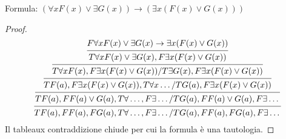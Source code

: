 Formula: $(\forall x F(x) \lor \exists G(x)) \rightarrow (\exists x (F(x) \lor G(x)))$
\begin{proof}
\begin{equation*}
\begin{prooftree}
\hypo{F \forall x F(x) \lor \exists G(x) \rightarrow \exists x (F(x) \lor G(x))}
\infer1{T \forall x F(x) \lor \exists G(x),F \exists x (F(x) \lor G(x))}
\infer1{T \forall x F(x),F \exists x (F(x) \lor G(x))/T \exists G(x),F \exists x (F(x) \lor G(x))}
\infer1{T F(a),F \exists x (F(x) \lor G(x)),T \forall x \dots/T G(a),F \exists x (F(x) \lor G(x))}
\infer1{T F(a),F F(a) \lor G(a),T \forall \dots,F \exists \dots/T G(a),F F(a) \lor G(a),F \exists \dots}
\infer1{T F(a),F F(a),F G(a),T \forall \dots,F \exists \dots/T G(a),F F(a),F G(a),F \exists \dots}
\end{prooftree}
\end{equation*}
Il tableaux contraddizione chiude per cui la formula è una tautologia.
\end{proof}
